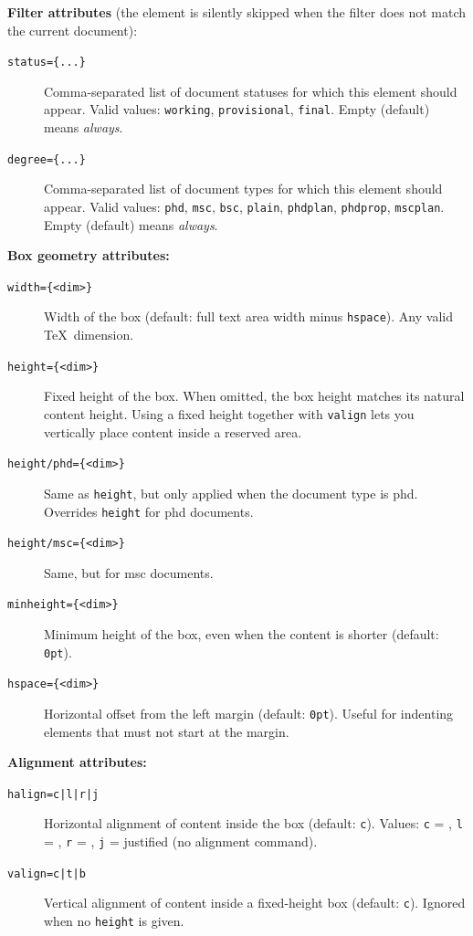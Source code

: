 \medskip
\noindent\textbf{Filter attributes} (the element is silently skipped when
the filter does not match the current document):

\begin{description}
  \item[\texttt{status=\{...\}}] Comma-separated list of document statuses
        for which this element should appear.  Valid values: \texttt{working},
        \texttt{provisional}, \texttt{final}.  Empty (default) means
        \emph{always}.
  \item[\texttt{degree=\{...\}}] Comma-separated list of document types
        for which this element should appear.  Valid values: \texttt{phd},
        \texttt{msc}, \texttt{bsc}, \texttt{plain}, \texttt{phdplan},
        \texttt{phdprop}, \texttt{mscplan}.  Empty (default) means
        \emph{always}.
\end{description}

\medskip
\noindent\textbf{Box geometry attributes:}

\begin{description}
  \item[\texttt{width=\{<dim>\}}] Width of the box (default: full text area
        width minus \texttt{hspace}).  Any valid \TeX\ dimension.
  \item[\texttt{height=\{<dim>\}}] Fixed height of the box.  When omitted, the
        box height matches its natural content height.  Using a fixed height
        together with \texttt{valign} lets you vertically place content inside
        a reserved area.
  \item[\texttt{height/phd=\{<dim>\}}] Same as \texttt{height}, but only
        applied when the document type is \gls{phd}.  Overrides \texttt{height} for
        \gls{phd} documents.
  \item[\texttt{height/msc=\{<dim>\}}] Same, but for \gls{msc} documents.
  \item[\texttt{minheight=\{<dim>\}}] Minimum height of the box, even when the
        content is shorter (default: \texttt{0pt}).
  \item[\texttt{hspace=\{<dim>\}}] Horizontal offset from the left margin
        (default: \texttt{0pt}).  Useful for indenting elements that must not
        start at the margin.
\end{description}

\medskip
\noindent\textbf{Alignment attributes:}

\begin{description}
  \item[\texttt{halign=c|l|r|j}] Horizontal alignment of content inside the
        box (default: \texttt{c}).  Values: \texttt{c} = \latexinline{\centering},
        \texttt{l} = \latexinline{\raggedright}, \texttt{r} = \latexinline{\raggedleft},
        \texttt{j} = justified (no alignment command).
  \item[\texttt{valign=c|t|b}] Vertical alignment of content inside a
        fixed-height box (default: \texttt{c}).  Ignored when no \texttt{height}
        is given.
\end{description}

